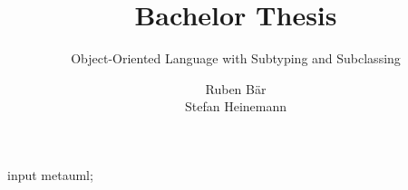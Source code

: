 \documentclass{ooplssTemplate}
\begin{document}
\begin{empfile}
\begin{empcmds}
input metauml;
\end{empcmds}

\title{Bachelor Thesis}
\subtitle{Object-Oriented Language with Subtyping and Subclassing}

\author{Ruben Bär\\
Stefan Heinemann}




\maketitle



\thispagestyle{empty}

\tableofcontents


















\end{empfile}
\end{document}

